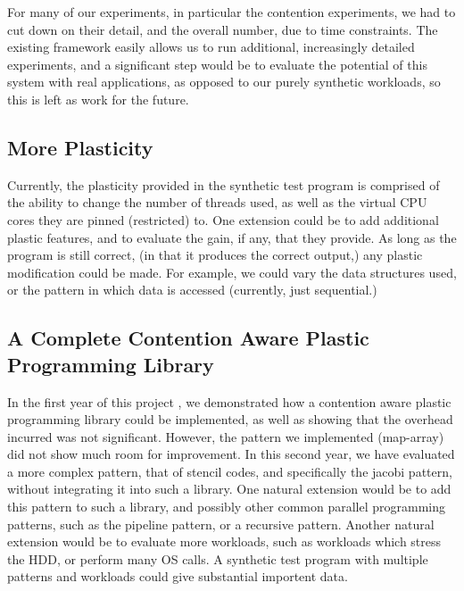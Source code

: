 For many of our experiments, in particular the contention experiments, we had to cut down on their detail, and the overall number, due to time constraints. The existing framework easily allows us to run additional, increasingly detailed experiments, and a significant step would be to evaluate the potential of this system with real applications, as opposed to our purely synthetic workloads, so this is left as work for the future.



\subsection{More Plasticity}
\label{section:conclusion_and_future_work:more_plasticity}

Currently, the plasticity provided in the synthetic test program is comprised of the ability to change the number of threads used, as well as the virtual CPU cores they are pinned (restricted) to. One extension could be to add additional plastic features, and to evaluate the gain, if any, that they provide. As long as the program is still correct, (in that it produces the correct output,) any plastic modification could be made. For example, we could vary the data structures used, or the pattern in which data is accessed (currently, just sequential.)



\subsection{A Complete Contention Aware Plastic Programming Library}
\label{section:conclusion_and_future_work:a_complete_contention_aware_plastic_parallel_programming_library}

In the first year of this project \cite{me}, we demonstrated how a contention aware plastic programming library could be implemented, as well as showing that the overhead incurred was not significant. However, the pattern we implemented (map-array) did not show much room for improvement. In this second year, we have evaluated a more complex pattern, that of stencil codes, and specifically the jacobi pattern, without integrating it into such a library. One natural extension would be to add this pattern to such a library, and possibly other common parallel programming patterns, such as the pipeline pattern, or a recursive pattern. Another natural extension would be to evaluate more workloads, such as workloads which stress the HDD, or perform many OS calls. A synthetic test program with multiple patterns and workloads could give substantial importent data.



